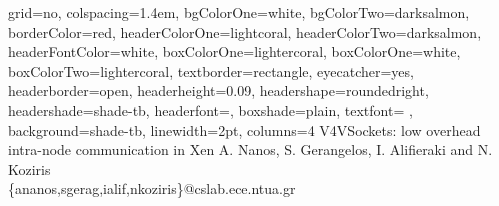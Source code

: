 \documentclass[a0paper,portrait,final]{baposter}
\begin{document}
\newlength{\leftimgwidth}
\begin{poster}%
  {
  grid=no,
  colspacing=1.4em,
  bgColorOne=white,
  bgColorTwo=darksalmon,
  borderColor=red,
  headerColorOne=lightcoral,
  headerColorTwo=darksalmon,
  headerFontColor=white,
  boxColorOne=lightercoral,
  boxColorOne=white,
  boxColorTwo=lightercoral,
  textborder=rectangle,
  eyecatcher=yes,
  headerborder=open,
  headerheight=0.09\textheight,
  headershape=roundedright,
  headershade=shade-tb,
  headerfont=\Large\textsf, %
  boxshade=plain,
  textfont={ },
  background=shade-tb,
  linewidth=2pt,
  columns=4
  }
  {
   }
  {V4VSockets: low overhead intra-node communication in Xen}
  {A. Nanos, S. Gerangelos, I. Alifieraki and N. Koziris\\ \{ananos,sgerag,ialif,nkoziris\}@cslab.ece.ntua.gr}
  {   
   }

\end{poster}
\end{document}
